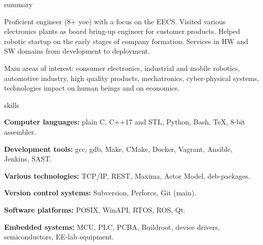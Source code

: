 \documentclass{template}
\begin{document}
\begin{rSection}{summary}

Proficient engineer (8+ yoe) with a focus on the EECS. Visited various electronics plants as board bring-up
engineer for customer products. Helped robotic startup on the early stages of company formation. Services in
HW and SW domains from development to deployment.

Main areas of interest: consumer electronics,
industrial and mobile robotics, automotive industry, high quality products, mechatronics, cyber-physical systems,
technologies impact on human beings and on economics.

\end{rSection}

\begin{rSection}{skills}
\begin{rItemize}

\item \textbf{Computer languages:} plain C, C++17 and STL, Python, Bash, TeX, 8-bit assembler.
\item \textbf{Development tools:} gcc, gdb, Make, CMake, Docker, Vagrant, Ansible, Jenkins, SAST.
\item \textbf{Various technologies:} TCP/IP, REST, Maxima, Actor Model, deb-packages.
\item \textbf{Version control systems:} Subversion, Perforce, Git (main).
\item \textbf{Software platforms:} POSIX, WinAPI, RTOS, ROS, Qt.
\item \textbf{Embedded systems:} MCU, PLC, PCBA, Buildroot, device drivers, semiconductors, EE-lab equipment.

\end{rItemize}
\end{rSection}
\end{document}
